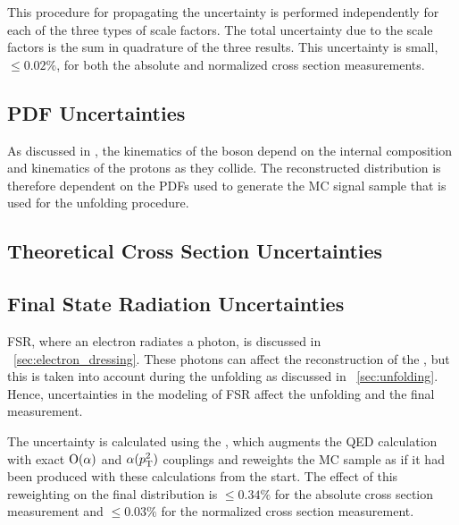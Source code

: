 This procedure for propagating the uncertainty is performed independently for
each of the three types of scale factors. The total uncertainty due to the
scale factors is the sum in quadrature of the three results. This uncertainty
is small, $\le 0.02\%$, for both the absolute and normalized cross section
measurements.

\subsection{PDF Uncertainties}

As discussed in , the kinematics of
the \Z boson depend on the internal composition and kinematics of the protons
as they collide. The reconstructed \phistar distribution is therefore dependent
on the PDFs used to generate the MC signal sample that is used for the
unfolding procedure.


\subsection{Theoretical Cross Section Uncertainties}
\label{ssec:theoretical_cross_section_uncertainties}


\subsection{Final State Radiation Uncertainties}
\label{ssec:fsr_uncertainties}

FSR, where an electron radiates a photon, is discussed in
\SEC~\ref{sec:electron_dressing}. These photons can affect the reconstruction
of the \Z, but this is taken into account during the unfolding as discussed in
\SEC~\ref{sec:unfolding}. Hence, uncertainties in the modeling of FSR affect
the unfolding and the final measurement.

The uncertainty is calculated using the \FSRWeightProducer, which augments the
\PYTHIA QED calculation with exact $\operatorname{O}\!\left( \alpha \right)$ and $\alpha(p_{\mathrm{T}}^{2})$
couplings and reweights the MC sample as if it had been produced with these
calculations from the start. The effect of this reweighting on the final
\phistar distribution is $\le 0.34\%$ for the absolute cross section
measurement and $\le 0.03\%$ for the normalized cross section measurement.

